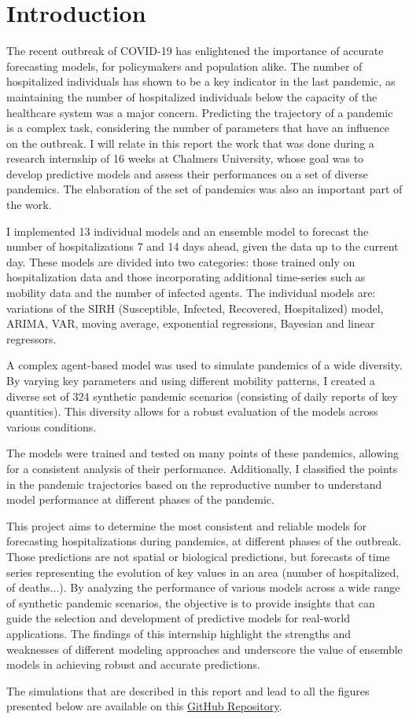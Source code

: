 \section{Introduction}

The recent outbreak of COVID-19 has enlightened the importance of accurate forecasting models, for policymakers and population alike. 
The number of hospitalized individuals has shown to be a key indicator in the last pandemic, as maintaining the number of hospitalized individuals below the capacity of the healthcare system was a major concern.
Predicting the trajectory of a pandemic is a complex task, considering the number of parameters that have an influence on the outbreak. 
I will relate in this report the work that was done during a research internship of 16 weeks at Chalmers University, whose goal was to develop predictive models and assess their performances on a set of diverse pandemics. 
The elaboration of the set of pandemics was also an important part of the work. 

I implemented 13 individual models and an ensemble model to forecast the number of hospitalizations 7 and 14 days ahead, given the data up to the current day.
These models are divided into two categories: those trained only on hospitalization data and those incorporating additional time-series such as mobility data and the number of infected agents. 
The individual models are: variations of the SIRH (Susceptible, Infected, Recovered, Hospitalized) model, ARIMA, VAR, moving average, exponential regressions, Bayesian and linear regressors.

A complex agent-based model was used to simulate pandemics of a wide diversity. 
By varying key parameters and using different mobility patterns, I created a diverse set of 324 synthetic pandemic scenarios (consisting of daily reports of key quantities). 
This diversity allows for a robust evaluation of the models across various conditions.

The models were trained and tested on many points of these pandemics, allowing for a consistent analysis of their performance. 
Additionally, I classified the points in the pandemic trajectories based on the reproductive number to understand model performance at different phases of the pandemic.

This project aims to determine the most consistent and reliable models for forecasting hospitalizations during pandemics, at different phases of the outbreak. 
Those predictions are not spatial or biological predictions, but forecasts of time series representing the evolution of key values in an area (number of hospitalized, of deaths...). 
By analyzing the performance of various models across a wide range of synthetic pandemic scenarios, the objective is to provide insights that can guide the selection and development of predictive models for real-world applications. 
The findings of this internship highlight the strengths and weaknesses of different modeling approaches and underscore the value of ensemble models in achieving robust and accurate predictions.

The simulations that are described in this report and lead to all the figures presented below are available on this  \href{https://github.com/gregoirebechade/covid_internship}{GitHub Repository}\label{github-link}.

